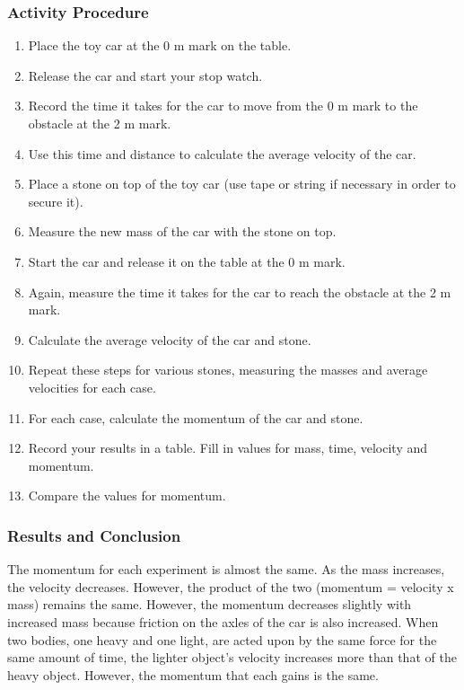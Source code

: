 \subsubsection*{Activity Procedure}
\begin{enumerate}
\item{Place the toy car at the 0 m mark on the table.}
\item{Release the car and start your stop watch.}
\item{Record the time it takes for the car to move from the 0 m mark to the obstacle at the 2 m mark.}
\item{Use this time and distance to calculate the average velocity of the car.}
\item{Place a stone on top of the toy car (use tape or string if necessary in order to secure it).}
\item{Measure the new mass of the car with the stone on top.}
\item{Start the car and release it on the table at the 0 m mark.}
\item{Again, measure the time it takes for the car to reach the obstacle at the 2 m mark.}
\item{Calculate the average velocity of the car and stone.}
\item{Repeat these steps for various stones, measuring the masses and average velocities for each case.}
\item{For each case, calculate the momentum of the car and stone.}
\item{Record your results in a table.  Fill in values for mass, time, velocity and momentum.}
\item{Compare the values for momentum.}
\end{enumerate}

\subsubsection*{Results and Conclusion}
The momentum for each experiment is almost the same.  As the mass increases, the velocity decreases.  However, the product of the two (momentum = velocity x mass) remains the same.  However, the momentum decreases slightly with increased mass because friction on the axles of the car is also increased.
When two bodies, one heavy and one light, are acted upon by the same force for the same amount of time, the lighter object's velocity increases more than that of the heavy object.  However, the momentum that each gains is the same.


